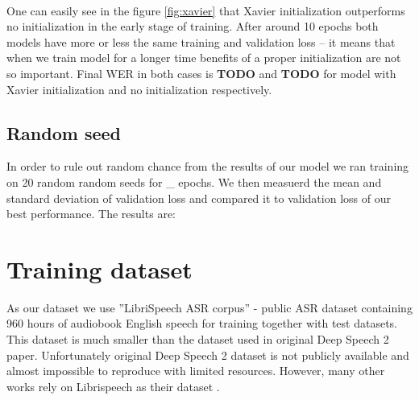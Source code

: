 \documentclass[licencjacka,en]{pracamgr}
\begin{document}
\noindent%
\begin{minipage}{\linewidth}%
		\label{fig:xavier}		     
\end{minipage}\\


One can easily see in the figure \ref{fig:xavier} that Xavier initialization outperforms no initialization in the early stage of training. After around 10 epochs both models have more or less the same training and validation loss -- it means that when we train model for a longer time benefits of a proper initialization are not so important. Final WER in both cases is \textbf{TODO} and \textbf{TODO} for model with Xavier initialization and no initialization respectively. 

\subsection{Random seed}
In order to rule out random chance from the results of our model we ran training on 20 random random seeds for \_ epochs. We then measuerd the mean and standard deviation of validation loss and compared it to validation loss of our best performance. The results are:

\section{Training dataset}
As our dataset we use ''LibriSpeech ASR corpus'' \cite{DATA} - public ASR dataset containing 960 hours of audiobook English speech for training together with test datasets. This dataset is much smaller than the dataset used in original Deep Speech 2 paper. Unfortunately original Deep Speech 2 dataset is not publicly available and almost impossible to reproduce with limited resources. However, many other works rely on Librispeech as their dataset \cite{LIBRI-EX}.
\end{document}
